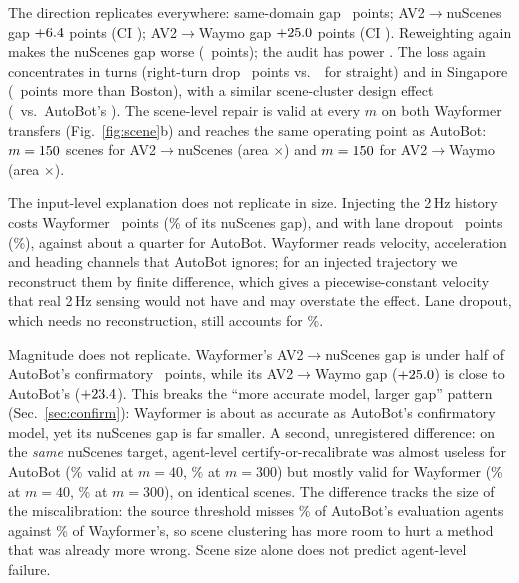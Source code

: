 The direction replicates everywhere: same-domain gap \gapSameWayformer\ points; AV2$\to$nuScenes gap
$+6.4$ points (CI \gapRawWayformerCI); AV2$\to$Waymo gap $+25.0$ points (CI \wmGapWfCI). Reweighting
again makes the nuScenes gap worse (\rewWayformer\ points); the audit has power \auditPowerWayformer. The loss again
concentrates in turns (right-turn drop \dropRightWf\ points vs.\
\dropStraightWf\ for straight) and in Singapore (\sgExtraRightWf\ points more than Boston), with a similar scene-cluster
design effect (\designEffWf\ vs.\ AutoBot's \designEffConf). The scene-level repair is valid at every $m$ on both
Wayformer transfers (Fig.~\ref{fig:scene}b) and reaches the same operating point as AutoBot: $m=150$ scenes for
AV2$\to$nuScenes (area \recAreaWfNs$\times$) and $m=150$ for AV2$\to$Waymo (area \recAreaWfWm$\times$).

The input-level explanation does not replicate in size. Injecting the 2\,Hz history costs Wayformer \wfInjHz\ points
(\wfInjHzFrac\% of its nuScenes gap), and with lane dropout \wfInjBoth\ points (\wfInjBothFrac\%), against about a quarter
for AutoBot. Wayformer reads velocity, acceleration and heading channels that AutoBot ignores; for an injected
trajectory we reconstruct them by finite difference, which gives a piecewise-constant velocity that real 2\,Hz sensing
would not have and may overstate the effect. Lane dropout, which needs no reconstruction, still accounts for \wfInjMapFrac\%.

Magnitude does not replicate. Wayformer's AV2$\to$nuScenes gap is under half of AutoBot's confirmatory
\gapRawConf\ points, while its AV2$\to$Waymo gap ($+25.0$) is close to AutoBot's ($+23.4$). This breaks the
``more accurate model, larger gap'' pattern (Sec.~\ref{sec:confirm}): Wayformer is about as accurate as AutoBot's
confirmatory model, yet its nuScenes gap is far smaller. A second, unregistered difference: on the \emph{same} nuScenes
target, agent-level certify-or-recalibrate was almost useless for AutoBot (\agentCorNsForty\% valid at $m=40$,
\agentCorNsThreeHundred\% at $m=300$) but mostly valid for Wayformer (\agentCorWfForty\% at $m=40$,
\agentCorWfThreeHundred\% at $m=300$), on identical scenes. The difference tracks the size of the miscalibration: the source threshold misses
\rSrcAutobot\% of AutoBot's evaluation agents against \rSrcWayformer\% of Wayformer's, so scene clustering has more room
to hurt a method that was already more wrong. Scene size alone does not predict agent-level failure.
